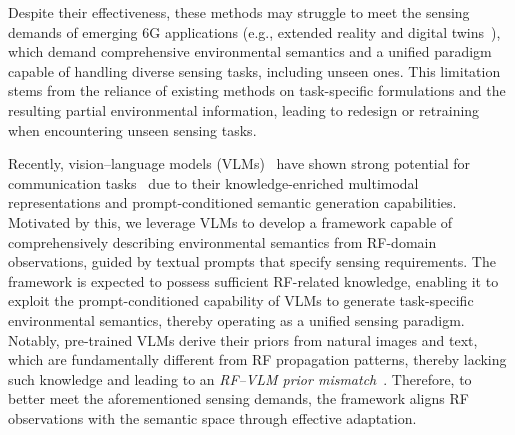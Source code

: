 \documentclass[journal,12pt,onecolumn,draftclsnofoot]{IEEEtran}
\begin{document}

Despite their effectiveness, these methods may struggle to meet the sensing demands of emerging 6G applications (e.g., extended reality and digital twins~\cite{10494372}), which demand comprehensive environmental semantics and a unified paradigm capable of handling diverse sensing tasks, including unseen ones. This limitation stems from the reliance of existing methods on task-specific formulations and the resulting partial environmental information, leading to redesign or retraining when encountering unseen sensing tasks.


Recently, vision–language models (VLMs)~\cite{bai2025qwen2} have shown strong potential for communication tasks~\cite{11434852,11432820} due to their knowledge-enriched multimodal representations and prompt-conditioned semantic generation capabilities. Motivated by this, we leverage VLMs to develop a framework capable of comprehensively describing environmental semantics from RF-domain observations, guided by textual prompts that specify sensing requirements. The framework is expected to possess sufficient RF-related knowledge, enabling it to exploit the prompt-conditioned capability of VLMs to generate task-specific environmental semantics, thereby operating as a unified sensing paradigm. Notably, pre-trained VLMs derive their priors from natural images and text, which are fundamentally different from RF propagation patterns, thereby lacking such knowledge and leading to an \emph{RF--VLM prior mismatch}~\cite{10892257}. Therefore, to better meet the aforementioned sensing demands, the framework aligns RF observations with the semantic space through effective adaptation.


\end{document}
